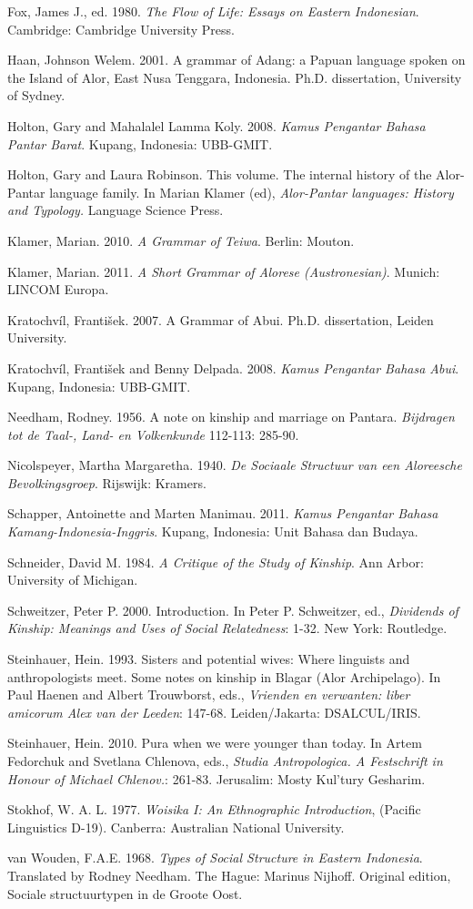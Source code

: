 Fox, James J., ed. 1980. \textit{The Flow of Life: Essays on Eastern Indonesian}. Cambridge: Cambridge University Press.

Haan, Johnson Welem. 2001. A grammar of Adang: a Papuan language spoken on the Island of Alor, East Nusa Tenggara, Indonesia. Ph.D. dissertation, University of Sydney.

Holton, Gary and Mahalalel Lamma Koly. 2008. \textit{Kamus Pengantar Bahasa Pantar Barat}. Kupang, Indonesia: UBB-GMIT.

Holton, Gary and Laura Robinson. This volume. The internal history of the Alor-Pantar language family. In Marian Klamer (ed), \textit{Alor-Pantar languages: History and Typology. }Language Science Press.

Klamer, Marian. 2010. \textit{A Grammar of Teiwa}. Berlin: Mouton.

Klamer, Marian. 2011. \textit{A Short Grammar of Alorese (Austronesian)}. Munich: LINCOM Europa.

Kratochv\'il, Franti\v{s}ek. 2007. A Grammar of Abui. Ph.D. dissertation, Leiden University.

Kratochv\'il, Franti\v{s}ek and Benny Delpada. 2008. \textit{Kamus Pengantar Bahasa Abui}. Kupang, Indonesia: UBB-GMIT.

Needham, Rodney. 1956. A note on kinship and marriage on Pantara. \textit{Bijdragen tot de Taal-, Land- en Volkenkunde} 112-113: 285-90.

Nicolspeyer, Martha Margaretha. 1940. \textit{De Sociaale Structuur van een Aloreesche Bevolkingsgroep}. Rijswijk: Kramers.

Schapper, Antoinette and Marten Manimau. 2011. \textit{Kamus Pengantar Bahasa Kamang-Indonesia-Inggris}. Kupang, Indonesia: Unit Bahasa dan Budaya.

Schneider, David M. 1984. \textit{A Critique of the Study of Kinship}. Ann Arbor: University of Michigan.

Schweitzer, Peter P. 2000. Introduction. In Peter P. Schweitzer, ed., \textit{Dividends of Kinship: Meanings and Uses of Social Relatedness}: 1-32. New York: Routledge.

Steinhauer, Hein. 1993. Sisters and potential wives: Where linguists and anthropologists meet. Some notes on kinship in Blagar (Alor Archipelago). In Paul Haenen and Albert Trouwborst, eds., \textit{Vrienden en verwanten: liber amicorum Alex van der Leeden}: 147-68. Leiden/Jakarta: DSALCUL/IRIS.

Steinhauer, Hein. 2010. Pura when we were younger than today. In Artem Fedorchuk and Svetlana Chlenova, eds., \textit{Studia Antropologica. A Festschrift in Honour of Michael Chlenov.}: 261-83. Jerusalim: Mosty Kul{\textquoteright}tury Gesharim.

Stokhof, W. A. L. 1977. \textit{Woisika I: An Ethnographic Introduction}, (Pacific Linguistics D-19). Canberra: Australian National University.

van Wouden, F.A.E. 1968. \textit{Types of Social Structure in Eastern Indonesia}. Translated by Rodney Needham. The Hague: Marinus Nijhoff. Original edition, Sociale structuurtypen in de Groote Oost.


